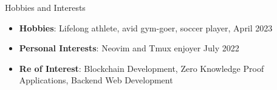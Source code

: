 \documentclass{cv} %
\begin{document}
\begin{rSection}{Hobbies and Interests}
	\begin{itemize}
		\item \textbf{Hobbies}{: Lifelong athlete, avid gym-goer, soccer player, } \hfill April 2023
		\item \textbf{Personal Interests}{: Neovim and Tmux enjoyer} \hfill July 2022
		\item \textbf{Re of Interest}{: Blockchain Development, Zero Knowledge Proof Applications, Backend Web Development}
	\end{itemize}
\end{rSection}
\end{document}
